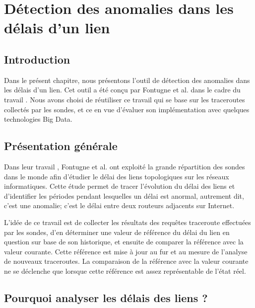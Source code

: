 \chapter{Détection des anomalies dans les délais d'un lien}\label{chap:algorith-detection}

\section{Introduction}
Dans le présent chapitre, nous présentons l'outil de détection des anomalies dans les délais d'un lien. Cet outil a été  conçu par Fontugne et al. dans le cadre du travail \cite{DBLP:journals/corr/FontugneAPB16}. Nous avons choisi de réutiliser ce travail qui se base sur les traceroutes collectés par les sondes, et ce en vue d'évaluer son implémentation avec quelques technologies  Big Data.  

\section{Présentation générale}

Dans leur travail \cite{DBLP:journals/corr/FontugneAPB16}, Fontugne et al. ont exploité la grande répartition  des sondes  dans le monde afin d'étudier le délai des liens topologiques sur les réseaux informatiques. Cette étude permet  de tracer l'évolution du délai des liens et d'identifier les périodes pendant lesquelles un délai est anormal, autrement dit, c'est une anomalie; c'est le délai entre deux routeurs adjacents sur Internet.

L'idée de ce travail est de collecter les résultats des requêtes traceroute effectuées par les sondes, d'en déterminer une valeur de référence du délai du lien en question sur base de  son historique, et ensuite de comparer la référence avec la valeur courante.  Cette référence est mise à jour au fur et au mesure de l'analyse de nouveaux traceroutes. 
La comparaison de la référence avec la valeur courante ne se déclenche que lorsque cette  référence est assez représentable de l'état réel.%


\section{Pourquoi analyser les délais des liens  ?}

